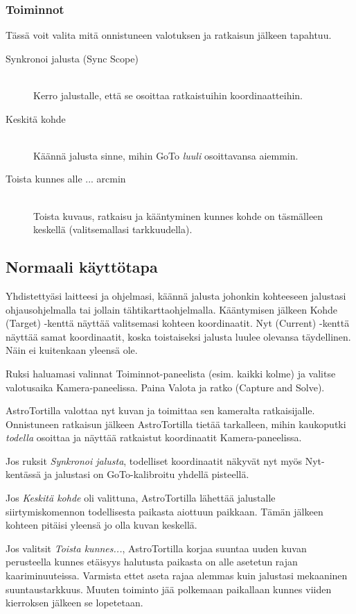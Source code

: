 \documentclass{article}
\begin{document}
\subsubsection{Toiminnot}

Tässä voit valita mitä onnistuneen valotuksen ja ratkaisun jälkeen tapahtuu.
\begin{description}
\item[Synkronoi jalusta (Sync Scope)] \hfill \\
Kerro jalustalle, että se osoittaa ratkaistuihin koordinaatteihin.
\item[Keskitä kohde] \hfill \\
Käännä jalusta sinne, mihin GoTo \emph{luuli} osoittavansa aiemmin.
\item[Toista kunnes alle ... arcmin ] \hfill \\
Toista kuvaus, ratkaisu ja kääntyminen kunnes kohde on täsmälleen keskellä (valitsemallasi tarkkuudella).
\end{description}

\subsection{Normaali käyttötapa}

Yhdistettyäsi laitteesi ja ohjelmasi, käännä jalusta johonkin kohteeseen 
jalustasi ohjausohjelmalla tai jollain tähtikarttaohjelmalla.
Kääntymisen jälkeen Kohde (Target) -kenttä näyttää valitsemasi kohteen koordinaatit. Nyt (Current) -kenttä näyttää samat koordinaatit,
koska toistaiseksi jalusta luulee olevansa täydellinen. Näin ei kuitenkaan yleensä ole.

Ruksi haluamasi valinnat Toiminnot-paneelista (esim. kaikki kolme) ja valitse valotusaika Kamera-paneelissa.
Paina Valota ja ratko (Capture and Solve).

AstroTortilla valottaa nyt kuvan ja toimittaa sen kameralta ratkaisijalle. Onnistuneen
ratkaisun jälkeen AstroTortilla tietää tarkalleen, mihin kaukoputki \emph{todella} osoittaa ja näyttää
ratkaistut koordinaatit Kamera-paneelissa.

Jos ruksit \emph{Synkronoi jalusta}, todelliset koordinaatit näkyvät nyt myös Nyt-kentässä ja jalustasi on GoTo-kalibroitu yhdellä pisteellä.

Jos \emph{Keskitä kohde} oli valittuna, AstroTortilla lähettää jalustalle siirtymiskomennon todellisesta paikasta aiottuun paikkaan. Tämän jälkeen kohteen pitäisi yleensä jo olla kuvan keskellä.

Jos valitsit \emph{Toista kunnes...}, AstroTortilla korjaa suuntaa uuden kuvan perusteella kunnes etäisyys halutusta paikasta on alle asetetun rajan kaariminuuteissa. Varmista ettet aseta rajaa alemmas kuin jalustasi mekaaninen suuntaustarkkuus. Muuten toiminto jää polkemaan paikallaan kunnes viiden kierroksen jälkeen se lopetetaan.
\end{document}
